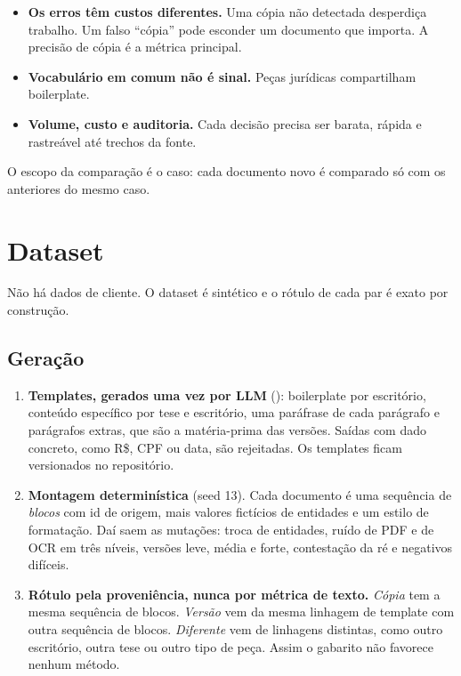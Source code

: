 \documentclass[11pt,a4paper]{article}
\newcommand{\cfg}[1]{\texttt{\detokenize{#1}}}
\begin{document}
\begin{itemize}
  \item \textbf{Os erros têm custos diferentes.} Uma cópia não detectada desperdiça trabalho. Um
    falso ``cópia'' pode esconder um documento que importa. A precisão de cópia é a métrica
    principal.
  \item \textbf{Vocabulário em comum não é sinal.} Peças jurídicas compartilham boilerplate.
  \item \textbf{Volume, custo e auditoria.} Cada decisão precisa ser barata, rápida e rastreável
    até trechos da fonte.
\end{itemize}

O escopo da comparação é o caso: cada documento novo é comparado só com os anteriores do mesmo
caso.

\section{Dataset}

Não há dados de cliente. O dataset é sintético e o rótulo de cada par é exato por construção.

\subsection{Geração}

\begin{enumerate}
  \item \textbf{Templates, gerados uma vez por LLM} (\cfg{gpt-4.1}): boilerplate por escritório,
    conteúdo específico por tese e escritório, uma paráfrase de cada parágrafo e parágrafos
    extras, que são a matéria-prima das versões. Saídas com dado concreto, como R\$, CPF ou data,
    são rejeitadas. Os templates ficam versionados no repositório.
  \item \textbf{Montagem determinística} (seed 13). Cada documento é uma sequência de
    \emph{blocos} com id de origem, mais valores fictícios de entidades e um estilo de
    formatação. Daí saem as mutações: troca de entidades, ruído de PDF e de OCR em três níveis,
    versões leve, média e forte, contestação da ré e negativos difíceis.
  \item \textbf{Rótulo pela proveniência, nunca por métrica de texto.} \emph{Cópia} tem a mesma
    sequência de blocos. \emph{Versão} vem da mesma linhagem de template com outra sequência de
    blocos. \emph{Diferente} vem de linhagens distintas, como outro escritório, outra tese ou
    outro tipo de peça. Assim o gabarito não favorece nenhum método.
\end{enumerate}
\end{document}
